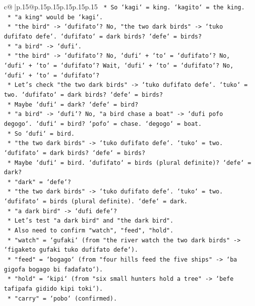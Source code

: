 \documentclass{article}
\begin{document}
{\begin{supertabular}{c@{$\;$}|p{.15\linewidth}@{}p{.15\linewidth}p{.15\linewidth}p{.15\linewidth}p{.15\linewidth}p{.15\linewidth}}
{{{\texttt{    *   So `kagi` = king. `kagito` = the king.} \\
\texttt{    *   "a king" would be `kagi`.} \\
\texttt{    *   "the bird" {-}> `dufifato`? No, "the two dark birds" {-}> `tuko dufifato defe`. `dufifato` = dark birds? `defe` = birds?} \\
\texttt{    *   "a bird" {-}> `dufi`.} \\
\texttt{    *   "the bird" {-}> `dufifato`? No, `dufi` + `to` = `dufifato`? No, `dufi` + `to` = `dufifato`? Wait, `dufi` + `to` = `dufifato`? No, `dufi` + `to` = `dufifato`?} \\
\texttt{    *   Let's check "the two dark birds" {-}> `tuko dufifato defe`. `tuko` = two. `dufifato` = dark birds? `defe` = birds?} \\
\texttt{    *   Maybe `dufi` = dark? `defe` = bird?} \\
\texttt{    *   "a bird" {-}> `dufi`? No, "a bird chase a boat" {-}> `dufi pofo degogo`. `dufi` = bird? `pofo` = chase. `degogo` = boat.} \\
\texttt{    *   So `dufi` = bird.} \\
\texttt{    *   "the two dark birds" {-}> `tuko dufifato defe`. `tuko` = two. `dufifato` = dark birds? `defe` = birds?} \\
\texttt{    *   Maybe `dufi` = bird. `dufifato` = birds (plural definite)? `defe` = dark?} \\
\texttt{    *   "dark" = `defe`?} \\
\texttt{    *   "the two dark birds" {-}> `tuko dufifato defe`. `tuko` = two. `dufifato` = birds (plural definite). `defe` = dark.} \\
\texttt{    *   "a dark bird" {-}> `dufi defe`?} \\
\texttt{    *   Let's test "a dark bird" and "the dark bird".} \\
\texttt{    *   Also need to confirm "watch", "feed", "hold".} \\
\texttt{    *   "watch" = `gufaki` (from "the river watch the two dark birds" {-}> `figaketo gufaki tuko dufifato defe`).} \\
\texttt{    *   "feed" = `bogago` (from "four hills feed the five ships" {-}> `ba gigofa bogago bi fadafato`).} \\
\texttt{    *   "hold" = `kipi` (from "six small hunters hold a tree" {-}> `befe tafipafa gidido kipi toki`).} \\
\texttt{    *   "carry" = `pobo` (confirmed).} \\
}}}
\end{supertabular}}
\end{document}
